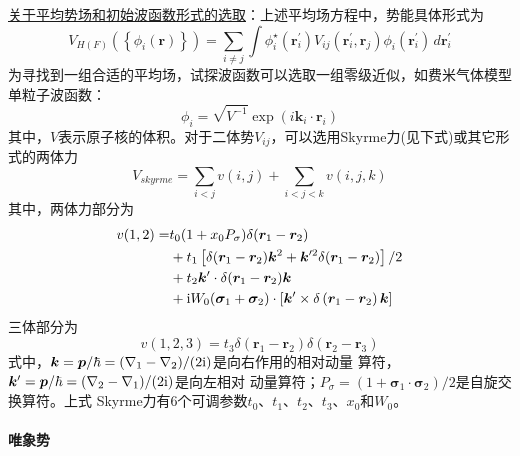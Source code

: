 \uline{关于平均势场和初始波函数形式的选取}：上述平均场方程中，势能具体形式为
\begin{equation}
    V_{H(F)}\left( \left\{ \phi_i(\bm{r}) \right\} \right) = \sum_{i \neq j} \int 
    \phi_i^{\star}(\bm{r}_i^{\prime}) V_{ij}(\bm{r}_i^{\prime}, \bm{r}_j) \phi_{i}(\bm{r}_i^{\prime})
    \,d\bm{r}_i^{\prime}
    \label{eq:mean-field}
\end{equation}
为寻找到一组合适的平均场，试探波函数可以选取一组零级近似，如费米气体模型单粒子波函数：
\begin{equation}
    \phi_i = \sqrt{V^{-1}} \exp{(i \bm{k}_i \cdot \bm{r}_i)}
    \label{eq:fermi-gas-eigen}
\end{equation}
其中，$V$表示原子核的体积。对于二体势$V_{ij}$，可以选用Skyrme力(见下式)或其它形式的两体力
\begin{equation}
    V_{skyrme} = \sum_{i<j} v(i, j) + \sum_{i<j<k} v(i, j, k)
    \label{eq:skyrme-forc}
\end{equation}
其中，两体力部分为
\begin{equation}
    \begin{aligned}
        v(1, 2) =& t_0 (1 + x_0 P_{\sigma})\delta(\bm{r}_1 - \bm{r}_2) \\
            & + t_1\left[ \delta(\bm{r}_1 - \bm{r}_2) \bm{k}^{2}
              + \bm{k}^{\prime 2}\delta(\bm{r}_1 - \bm{r}_2)\right] / 2 \\
            & + t_2\bm{k}^{\prime} \cdot \delta(\bm{r}_1 - \bm{r}_2) \bm{k} \\
            & + {\rm i} W_0(\bm{\sigma}_1 + \bm{\sigma}_2)\cdot \left[ 
            \bm{k}^{\prime} \times \delta\left( \bm{r}_1 - \bm{r}_2 \right) \bm{k}\right]
    \end{aligned}
    \label{eq:skyrme-tow-body-forc}
\end{equation}
三体部分为
\begin{equation}
    v(1, 2, 3) = t_3 \delta(\bm{r}_1 - \bm{r}_2) \delta(\bm{r}_2 - \bm{r}_3)
    \label{eq:skyrm-three-body-forc}
\end{equation}
式中，$\bm{k} = \bm{p}/\hbar = (\nabla_{1} - \nabla_{2}) / (2{\rm i})$是向右作用的相对动量
算符，$\bm{k}^{\prime} = \bm{p}/\hbar = (\nabla_{2} - \nabla_{1}) / (2{\rm i})$是向左相对
动量算符；$P_{\sigma} = (1 + \bm{\sigma}_1 \cdot \bm{\sigma}_2) / 2$是自旋交换算符。上式
Skyrme力有6个可调参数$t_0$、$t_1$、$t_2$、$t_3$、$x_0$和$W_0$。

\paragraph*{唯象势}

